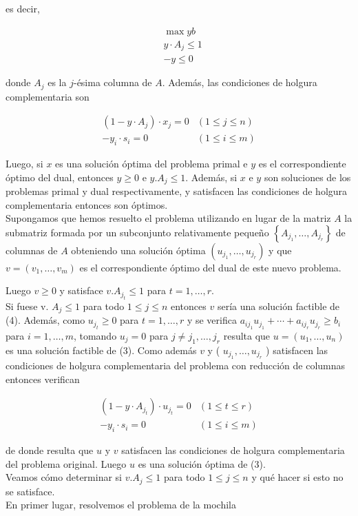 \documentclass[10pt]{article}
\begin{document}
es decir,


\begin{align*}
& \max y b \\
& y \cdot A_{j} \leq 1  \tag{4}\\
& -y \leq 0
\end{align*}


donde $A_{j}$ es la $j$-ésima columna de $A$. Además, las condiciones de holgura complementaria son

$$
\begin{aligned}
\left(1-y \cdot A_{j}\right) \cdot x_{j}=0 & (1 \leq j \leq n) \\
-y_{i} \cdot s_{i}=0 & (1 \leq i \leq m)
\end{aligned}
$$

Luego, si $x$ es una solución óptima del problema primal e $y$ es el correspondiente óptimo del dual, entonces $y \geq 0$ e $y . A_{j} \leq 1$. Además, si $x$ e $y$ son soluciones de los problemas primal y dual respectivamente, y satisfacen las condiciones de holgura complementaria entonces son óptimos.\\
Supongamos que hemos resuelto el problema utilizando en lugar de la matriz $A$ la submatriz formada por un subconjunto relativamente pequeño $\left\{A_{j_{1}}, \ldots, A_{j_{r}}\right\}$ de columnas de $A$ obteniendo una solución óptima $\left(u_{j_{1}}, \ldots, u_{j_{r}}\right)$ y que $v=\left(v_{1}, \ldots, v_{m}\right)$ es el correspondiente óptimo del dual de este nuevo problema.

Luego $v \geq 0$ y satisface $v . A_{j_{t}} \leq 1$ para $t=1, \ldots, r$.\\
Si fuese v. $A_{j} \leq 1$ para todo $1 \leq j \leq n$ entonces $v$ sería una solución factible de (4). Además, como $u_{j_{t}} \geq 0$ para $t=1, \ldots, r$ y se verifica $a_{i j_{1}} u_{j_{1}}+\cdots+a_{i j_{r}} u_{j_{r}} \geq b_{i}$ para $i=1, \ldots, m$, tomando $u_{j}=0$ para $j \neq j_{1}, \ldots, j_{r}$ resulta que $u=\left(u_{1}, \ldots, u_{n}\right)$ es una solución factible de (3). Como además $v$ y ( $u_{j_{1}}, \ldots, u_{j_{r}}$ ) satisfacen las condiciones de holgura complementaria del problema con reducción de columnas entonces verifican

$$
\begin{array}{rr}
\left(1-y \cdot A_{j_{t}}\right) \cdot u_{j_{t}}=0 & (1 \leq t \leq r) \\
-y_{i} \cdot s_{i}=0 & (1 \leq i \leq m)
\end{array}
$$

de donde resulta que $u$ y $v$ satisfacen las condiciones de holgura complementaria del problema original. Luego $u$ es una solución óptima de (3).\\
Veamos cómo determinar si $v . A_{j} \leq 1$ para todo $1 \leq j \leq n$ y qué hacer si esto no se satisface.\\
En primer lugar, resolvemos el problema de la mochila
\end{document}
